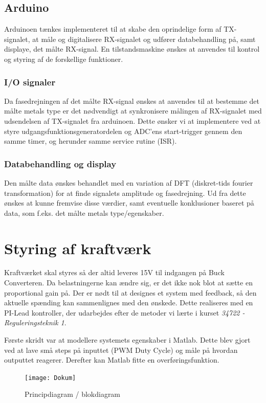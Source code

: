 \documentclass[../main.tex]{subfiles}
\begin{document}
\subsection{Arduino}
Arduinoen tænkes implementeret til at skabe den oprindelige form af TX-signalet, at måle og digitalisere RX-signalet og udfører databehandling på, samt displaye, det målte RX-signal.
En tilstandsmaskine ønskes at anvendes til kontrol og styring af de forskellige funktioner.

\subsubsection{I/O signaler}
Da fasedrejningen af det målte RX-signal ønskes at anvendes til at bestemme det målte metals type er det nødvendigt at synkronisere målingen af RX-signalet med udsendelsen af TX-signalet fra arduinoen. Dette ønsker vi at implementere ved at styre udgangsfunktionsgeneratordelen og ADC'ens start-trigger gennem den samme timer, og herunder samme service rutine (ISR).

\subsubsection{Databehandling og display}
Den målte data ønskes behandlet med en variation af DFT (diskret-tids fourier transformation) for at finde signalets amplitude og fasedrejning. Ud fra dette ønskes at kunne fremvise disse værdier, samt eventuelle konklusioner baseret på data, som f.eks. det målte metals type/egenskaber.

\section{Styring af kraftværk}
Kraftværket skal styres så der altid leveres 15V til indgangen på Buck Converteren. Da belastningerne kan ændre sig, er det ikke nok blot at sætte en proportional gain på. Der er nødt til at designes et system med feedback, så den aktuelle spænding kan sammenlignes med den ønskede. Dette realiseres med en PI-Lead kontroller, der udarbejdes efter de metoder vi lærte i kurset \emph{34722 - Reguleringsteknik 1}.

Første skridt var at modellere systemets egenskaber i Matlab. Dette blev gjort ved at lave små steps på inputtet (PWM Duty Cycle) og måle på hvordan outputtet reagerer. Derefter kan Matlab fitte en overføringsfunktion.

\begin{figure}[H]
      \texttt{[image: Dokum]}
     \caption{Principdiagram / blokdiagram}
     \label{fig: Principdiagram/blokdiagram}
     \end{figure}

     
\end{document}
